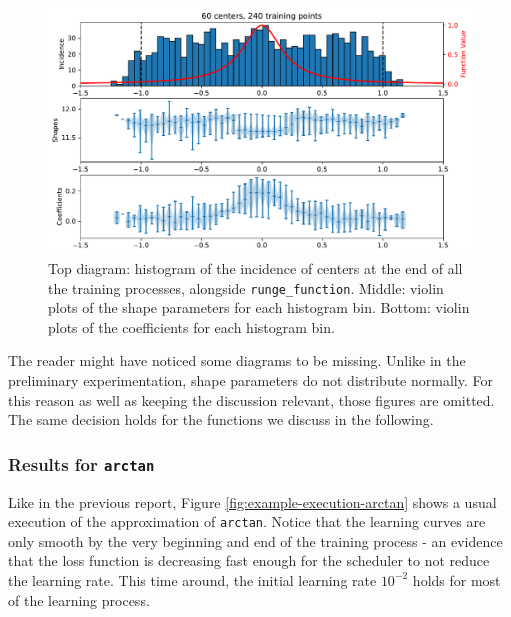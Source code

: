 \documentclass[12pt]{report} %
\begin{document}
\begin{figure}
  \includegraphics[width=\textwidth]{imagenes/experiments/1d/statistical_1d_full_scheduler_interpolation/runge_function/C60-TR240-runge_function.pdf}
  \caption{Top diagram: histogram of the incidence of centers at the end of all the training processes, alongside \texttt{runge\_function}. Middle: violin plots of the shape parameters for each histogram bin. Bottom: violin plots of the coefficients for each histogram bin.}
  \label{fig:triple-plot-runge-function}
\end{figure}

The reader might have noticed some diagrams to be missing. Unlike in the preliminary experimentation, shape parameters do not distribute normally. For this reason as well as keeping the discussion relevant, those figures are omitted. The same decision holds for the functions we discuss in the following.


\clearpage
\subsubsection*{Results for \texttt{arctan}}

Like in the previous report, Figure \ref{fig:example-execution-arctan} shows a usual execution of the approximation of \texttt{arctan}. Notice that the learning curves are only smooth by the very beginning and end of the training process - an evidence that the loss function is decreasing fast enough for the scheduler to not reduce the learning rate. This time around, the initial learning rate $10^{-2}$ holds for most of the learning process.
\end{document}
